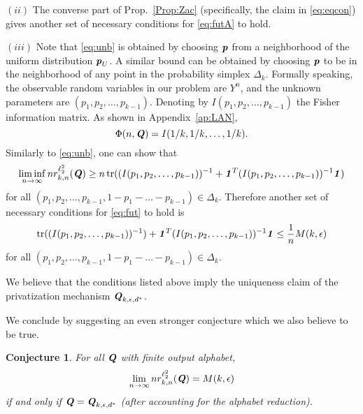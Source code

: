\documentclass[11pt,onecolumn]{IEEEtran}
\newtheorem{conjecture}{Conjecture}
\def\mathbi#1{{\textbf{\textit #1}}}
\DeclareMathOperator{\tr}{tr}
\begin{document}
\vspace*{.1in}
$(ii)$
The converse part of Prop.~\ref{Prop:Zac} (specifically, the claim in \eqref{eq:eqcon}) gives another set of necessary conditions for \eqref{eq:futA} to hold.

\vspace*{.1in}
$(iii)$
Note that \eqref{eq:unb} is obtained by choosing $\mathbi{p}$ from a neighborhood of the uniform distribution $\mathbi{p}_U$. A similar bound can be obtained by choosing $\mathbi{p}$ to be in the neighborhood of any point in the probability simplex $\Delta_k$.
Formally speaking, the observable random variables in our problem are $Y^n$, and the unknown parameters are
$(p_1,p_2,\dots,p_{k-1})$. Denoting by $I(p_1,p_2,\dots,p_{k-1})$ the Fisher information matrix. As shown in Appendix~\ref{ap:LAN}, $$
\Phi(n,\mathbi{Q}) = I(1/k,1/k,\dots,1/k).
$$
Similarly to \eqref{eq:unb}, one can show that
   $$
\liminf_{n\to \infty} n r_{k,n}^{\ell_2^2} (\mathbi{Q}) \ge
n  \tr( (I(p_1,p_2,\dots,p_{k-1}))^{-1}  + \mathbi{1}^T (I(p_1,p_2,\dots,p_{k-1}))^{-1} \mathbi{1} )
   $$
for all $(p_1,p_2,\dots,p_{k-1},1-p_1-\dots - p_{k-1})\in \Delta_k$.
Therefore another set of necessary conditions for \eqref{eq:fut} to hold is
$$
\tr( (I(p_1,p_2,\dots,p_{k-1}))^{-1} ) + \mathbi{1}^T (I(p_1,p_2,\dots,p_{k-1}))^{-1} \mathbi{1} 
\le \frac 1n M(k,\epsilon)
$$
for all $(p_1,p_2,\dots,p_{k-1},1-p_1-\dots - p_{k-1})\in \Delta_k$.

We believe that the conditions listed above imply the uniqueness claim of the privatization mechanism 
$\mathbi{Q}_{k,\epsilon,d^\ast}$.

We conclude by suggesting an even stronger conjecture which we also believe to be true.
\begin{conjecture}
For all $\mathbi{Q}$ with finite output alphabet,
$$
\lim_{n\to \infty} n r_{k,n}^{\ell_2^2} (\mathbi{Q}) =
 M(k,\epsilon)
$$
if and only if $\mathbi{Q} = \mathbi{Q}_{k,\epsilon,d^\ast}$ (after accounting for the alphabet reduction).
\end{conjecture}
\end{document}
